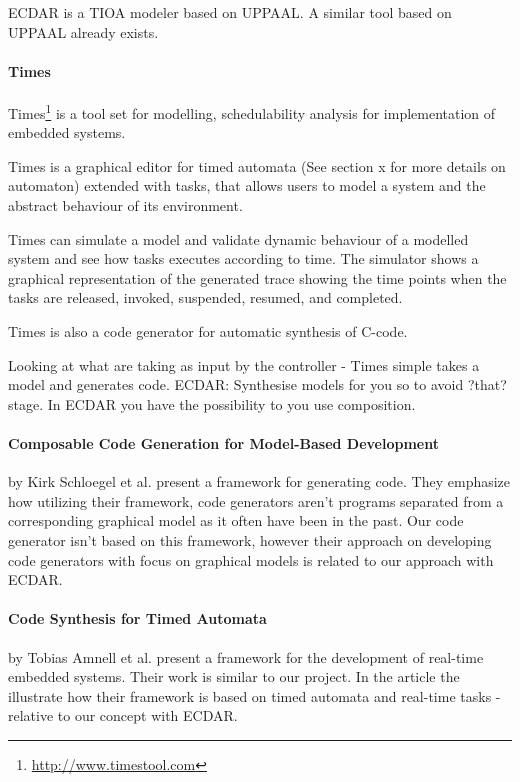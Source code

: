 ECDAR is a TIOA modeler based on UPPAAL. A similar tool based on UPPAAL already
exists.

\paragraph{Times}
Times\footnote{\url{http://www.timestool.com}} is a tool set for modelling, schedulability analysis for implementation of embedded systems.

Times is a graphical editor for timed automata (See section x for more details on automaton) extended with tasks, that allows users to model a system and the abstract behaviour of its environment.

Times can simulate a model and validate dynamic behaviour of a modelled system and see how tasks executes according to time. The simulator shows a graphical representation of the generated trace showing the time points when the tasks are released, invoked, suspended, resumed, and completed.

Times is also a code generator for automatic synthesis of C-code. 

Looking at what are taking as input by the controller - Times simple takes a
model and generates code. ECDAR: Synthesise models for you so to avoid ?that?
stage. In ECDAR you have the possibility to you use composition.


\paragraph{Composable Code Generation for Model-Based Development}
by Kirk Schloegel et al. present a framework for generating
code\cite{composable-code-generation}. They emphasize how utilizing their
framework, code generators aren't programs separated from a corresponding
graphical model as it often have been in the past. Our code generator isn't
based on this framework, however their approach on developing code generators
with focus on graphical models is related to our approach with ECDAR.

\paragraph{Code Synthesis for Timed Automata}
by Tobias Amnell et al. present a framework for the development of real-time
embedded systems\cite{Amnell:2002:CST:779110.779112}. Their work is similar to
our project. In the article the illustrate how their framework is based on timed
automata and real-time tasks - relative to our concept with ECDAR.

